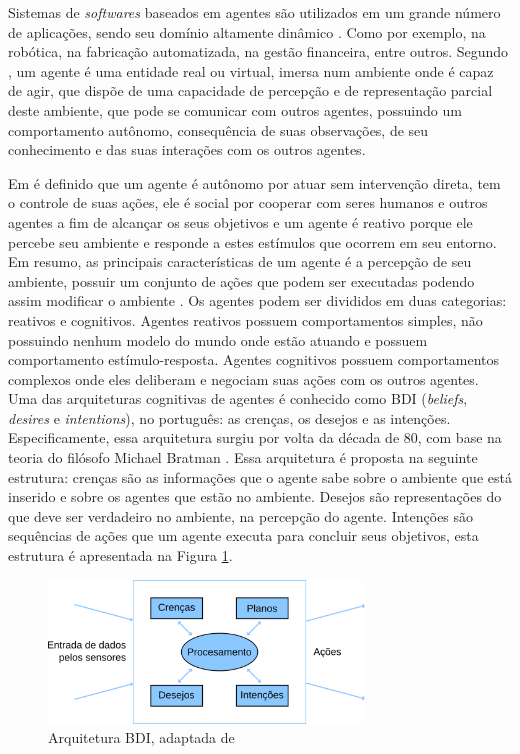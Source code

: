 \documentclass[conference]{IEEEtran}
\begin{document}
    Sistemas de \textit{softwares} baseados em agentes são utilizados em um grande número de aplicações, sendo seu domínio altamente dinâmico \cite{evertsz2015using}. Como por exemplo, na robótica, na fabricação automatizada, na gestão financeira, entre outros. Segundo \cite{ferber1991tutorial}, um agente é uma entidade real ou virtual, imersa num ambiente onde é capaz de agir, que dispõe de uma capacidade de percepção e de representação parcial deste ambiente, que pode se comunicar com outros agentes, possuindo um comportamento autônomo, consequência de suas observações, de seu conhecimento e das suas interações com os outros agentes.
        
    Em \cite{bellifemine2007developing} é definido que um agente é autônomo por atuar sem intervenção direta, tem o controle de suas ações, ele é social por cooperar com seres humanos e outros agentes a fim de alcançar os seus objetivos e um agente é reativo porque ele percebe seu ambiente e responde a estes estímulos que ocorrem em seu entorno. Em resumo, as principais características de um agente é a percepção de seu ambiente, possuir um conjunto de ações que podem ser executadas podendo assim modificar o ambiente \cite{bordini2007programming}.    
        Os agentes podem ser divididos em duas categorias: reativos e cognitivos. Agentes reativos possuem comportamentos simples, não possuindo nenhum modelo do mundo onde estão atuando e possuem comportamento estímulo-resposta. Agentes cognitivos possuem comportamentos complexos onde eles deliberam e negociam suas ações com os outros agentes. Uma das arquiteturas cognitivas de agentes é conhecido como BDI (\textit{beliefs}, \textit{desires} e \textit{intentions}), no português: as crenças, os desejos e as intenções. Especificamente, essa arquitetura surgiu por volta da década de 80, com base na teoria do filósofo Michael Bratman \cite{sichman2003raciocinio}.
        Essa arquitetura é proposta na seguinte estrutura: crenças são as informações que o agente sabe sobre o ambiente que está inserido e sobre os agentes que estão no ambiente. Desejos são representações do que deve ser verdadeiro no ambiente, na percepção do agente. Intenções são sequências de ações que um agente executa para concluir seus objetivos, esta estrutura é apresentada na Figura \ref{fig:bdi}.
        
        \begin{figure}[ht]
            \begin{center}
                \includegraphics[width=3.3in]{BDI.png}
            \end{center}
            \caption{Arquitetura BDI, adaptada de \cite{weiss1999multiagent}}
            \label{fig:bdi}
        \end{figure}
        
\end{document}
